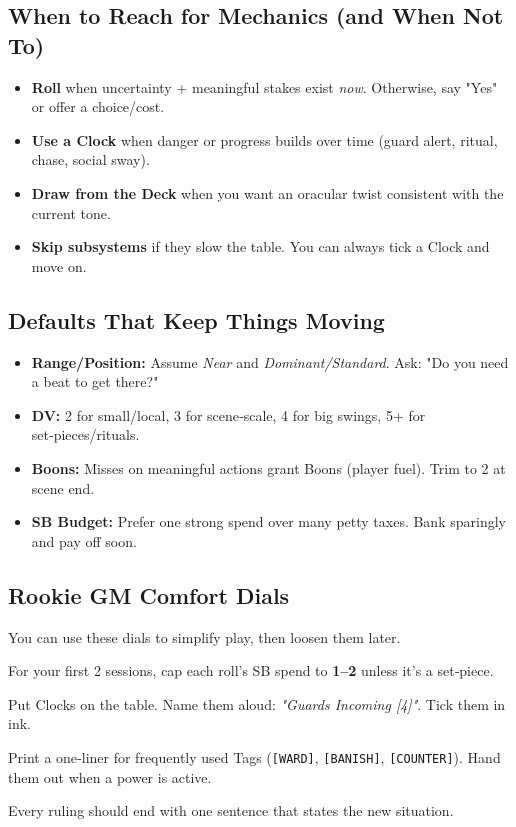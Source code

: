 \subsection{When to Reach for Mechanics (and When Not To)}
\begin{itemize}
  \item \textbf{Roll} when uncertainty + meaningful stakes exist \emph{now}. Otherwise, say "Yes" or offer a choice/cost.
  \item \textbf{Use a Clock} when danger or progress builds over time (guard alert, ritual, chase, social sway).
  \item \textbf{Draw from the Deck} when you want an oracular twist consistent with the current tone.
  \item \textbf{Skip subsystems} if they slow the table. You can always tick a Clock and move on.
\end{itemize}

\subsection{Defaults That Keep Things Moving}
\begin{itemize}
  \item \textbf{Range/Position:} Assume \emph{Near} and \emph{Dominant/Standard}. Ask: "Do you need a beat to get there?"
  \item \textbf{DV:} 2 for small/local, 3 for scene‑scale, 4 for big swings, 5+ for set‑pieces/rituals.
  \item \textbf{Boons:} Misses on meaningful actions grant Boons (player fuel). Trim to 2 at scene end.
  \item \textbf{SB Budget:} Prefer one strong spend over many petty taxes. Bank sparingly and pay off soon.
\end{itemize}

\subsection{Rookie GM Comfort Dials}
You can use these dials to simplify play, then loosen them later.
\begin{description}[leftmargin=1.5em, style=nextline]
  \item[Soft SB:] For your first 2 sessions, cap each roll's SB spend to \textbf{1--2} unless it's a set‑piece.
  \item[Visible Clocks:] Put Clocks on the table. Name them aloud: \emph{"Guards Incoming [4]"}. Tick them in ink.
  \item[Tag Cards:] Print a one‑liner for frequently used Tags (\texttt{[WARD]}, \texttt{[BANISH]}, \texttt{[COUNTER]}). Hand them out when a power is active.
  \item[One Move, One Sentence:] Every ruling should end with one sentence that states the new situation.
\end{description}

